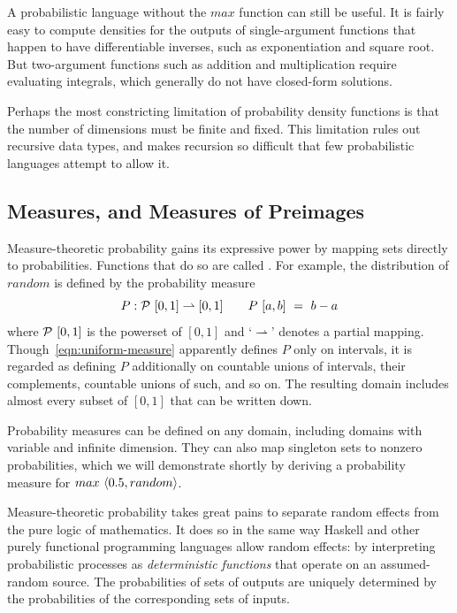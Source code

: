 \documentclass{llncs}
\newcommand{\pto}{\rightharpoonup}
\begin{document}
A probabilistic language without the $max$ function can still be useful.
It is fairly easy to compute densities for the outputs of single-argument functions that happen to have differentiable inverses, such as exponentiation and square root.
But two-argument functions such as addition and multiplication require evaluating integrals, which generally do not have closed-form solutions.

Perhaps the most constricting limitation of probability density functions is that the number of dimensions must be finite and fixed.
This limitation rules out recursive data types, and makes recursion so difficult that few probabilistic languages attempt to allow it.

\subsection{Measures, and Measures of Preimages}

Measure-theoretic probability gains its expressive power by mapping sets directly to probabilities.
Functions that do so are called .
For example, the distribution of $random$ is defined by the probability measure
\begin{equation}
	P : \powerset~[0,1] \pto [0,1]\ \ \ \ \ \ P~[a,b]\ =\ b - a
\label{eqn:uniform-measure}
\end{equation}
where $\mathcal{P}~[0,1]$ is the powerset of $[0,1]$ and `$\pto$' denotes a partial mapping.
Though~\eqref{eqn:uniform-measure} apparently defines $P$ only on intervals, it is regarded as defining $P$ additionally on countable unions of intervals, their complements, countable unions of such, and so on.
The resulting domain includes almost every subset of $[0,1]$ that can be written down.

Probability measures can be defined on any domain, including domains with variable and infinite dimension.
They can also map singleton sets to nonzero probabilities, which we will demonstrate shortly by deriving a probability measure for $max~\langle{0.5,random}\rangle$.

Measure-theoretic probability takes great pains to separate random effects from the pure logic of mathematics.
It does so in the same way Haskell and other purely functional programming languages allow random effects: by interpreting probabilistic processes as \emph{deterministic functions} that operate on an assumed-random source.
The probabilities of sets of outputs are uniquely determined by the probabilities of the corresponding sets of inputs.
\end{document}
